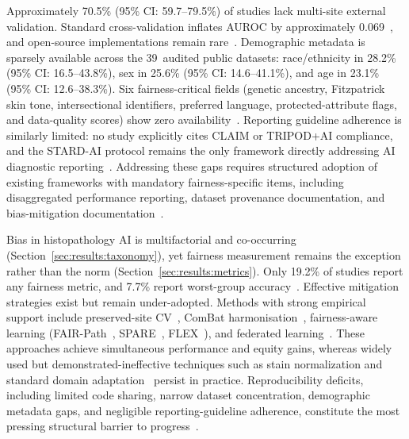 Approximately 70.5\% (95\% CI: 59.7--79.5\%) of studies lack multi-site external validation. Standard
cross-validation inflates AUROC by approximately 0.069~\citep{howard2021site}, and
open-source implementations remain rare~\citep{koh2021wilds,
weng2024grandqc}. Demographic metadata is sparsely available across the 39~audited public datasets: race/ethnicity in 28.2\% (95\% CI: 16.5--43.8\%), sex in 25.6\% (95\% CI: 14.6--41.1\%), and age in 23.1\% (95\% CI: 12.6--38.3\%). Six fairness-critical fields (genetic ancestry, Fitzpatrick skin tone, intersectional identifiers, preferred language, protected-attribute flags, and data-quality scores) show zero availability~\citep{norori2021addressing, montezuma2025unbiased}. Reporting guideline adherence is similarly limited: no
study explicitly cites CLAIM or TRIPOD+AI compliance, and the STARD-AI
protocol remains the only framework directly addressing AI
diagnostic reporting~\citep{sounderajah2021stardai}. Addressing these gaps requires structured
adoption of existing frameworks with mandatory fairness-specific items,
including disaggregated performance reporting, dataset provenance documentation, and bias-mitigation
documentation~\citep{chen2023algorithmic, yang2024survey,
chinta2025aidriven}.

\label{sec:results:summary}%
Bias in histopathology AI is multifactorial and co-occurring
(Section~\ref{sec:results:taxonomy}), yet fairness measurement remains
the exception rather than the norm
(Section~\ref{sec:results:metrics}). Only 19.2\% of studies report any
fairness metric, and 7.7\% report worst-group
accuracy~\citep{zong2023medfair, vaidya2024demographic}. Effective mitigation strategies exist but remain under-adopted. Methods with strong empirical
support include preserved-site CV~\citep{howard2021site}, ComBat
harmonisation~\citep{murchan2024combat}, fairness-aware learning
(FAIR-Path~\citep{lin2025contrastive}, SPARE~\citep{xu2026spare},
FLEX~\citep{huang2025knowledge}), and federated
learning~\citep{hosseini2023proportionally, zhang2025dynamicfl}. These approaches achieve
simultaneous performance and equity gains, whereas widely used but
demonstrated-ineffective techniques such as stain normalization and standard
domain adaptation~\citep{voon2023evaluating, koh2021wilds} persist in practice.
Reproducibility deficits, including limited code sharing, narrow dataset
concentration, demographic metadata gaps, and negligible
reporting-guideline adherence, constitute the most pressing structural
barrier to progress~\citep{norori2021addressing, sounderajah2021stardai,
chinta2025aidriven}.
